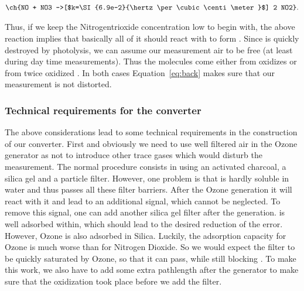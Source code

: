 \begin{align}
  \ch{NO + NO3 ->[$k=\SI{6.9e-2}{\hertz\per\cubic\centi\meter}$] 2 NO2}.\label{eq:back}
\end{align}

Thus, if we keep the Nitrogentrioxide concentration low to begin with,
the above reaction implies that basically all of it should react with
 to form . Since  is quickly destroyed by
photolysis, we can assume our measurement air to be  free (at
least during day time measurements). Thus the molecules come either
from oxidizes  or from twice oxidized . In both cases
Equation~\eqref{eq:back} makes sure that our measurement is not distorted.

\subsubsection{Technical requirements for the converter}
\label{sec:requirements}

The above considerations lead to some technical requirements in the
construction of our converter. First and obviously we need to use well
filtered air in the Ozone generator as not to introduce other trace
gases which would disturb the measurement. The normal procedure
consists in using an activated charcoal, a silica gel and a particle
filter. However, one problem is that  is hardly soluble in
water and thus passes all these filter barriers. After the Ozone
generation it will react with it and lead to an additional 
signal, which cannot be neglected. To remove this signal, one can add
another silica gel filter after the generation.  is well
adsorbed within, which should lead to the desired reduction of the
error. However, Ozone is also adsorbed in Silica. Luckily, the
adsorption capacity for Ozone is much worse than for Nitrogen
Dioxide. So we would expect the filter to be quickly saturated by
Ozone, so that it can pass, while still blocking . To make
this work, we also have to add some extra pathlength after the
generator to make sure that the oxidization took place before we add
the filter.

